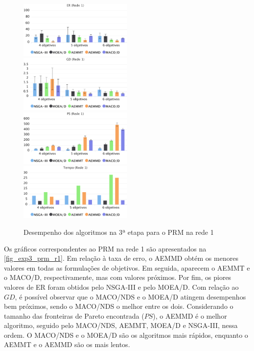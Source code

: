 \begin{figure}[!htbp]
	\includegraphics[width=0.5\textwidth]{cap_experimentos/figs/etapa3/er-mrp-r1}
	\includegraphics[width=0.5\textwidth]{cap_experimentos/figs/etapa3/gd-mrp-r1}
	\includegraphics[width=0.5\textwidth]{cap_experimentos/figs/etapa3/ps-mrp-r1}
	\includegraphics[width=0.5\textwidth]{cap_experimentos/figs/etapa3/time-mrp-r1}
	\caption{\label{fig_exp3_prm_r1}Desempenho dos algoritmos na 3ª etapa para o PRM na rede 1}
\end{figure}

Os gráficos correspondentes ao PRM na rede 1 são apresentados na \autoref{fig_exp3_prm_r1}. Em relação à taxa de erro, o AEMMD obtém os menores valores em todas as formulações de objetivos. Em seguida, aparecem o AEMMT e o MACO/D, respectivamente, mas com valores próximos. Por fim, os piores valores de ER foram obtidos pelo NSGA-III e pelo MOEA/D. Com relação ao $GD$, é possível observar que o MACO/NDS e o MOEA/D atingem desempenhos bem próximos, sendo o MACO/NDS o melhor entre os dois. Considerando o tamanho das fronteiras de Pareto encontrada ($PS$), o AEMMD é o melhor algoritmo, seguido pelo MACO/NDS, AEMMT, MOEA/D e NSGA-III, nessa ordem. O MACO/NDS e o MOEA/D são os algoritmos mais rápidos, enquanto o AEMMT e o AEMMD são os mais lentos.

